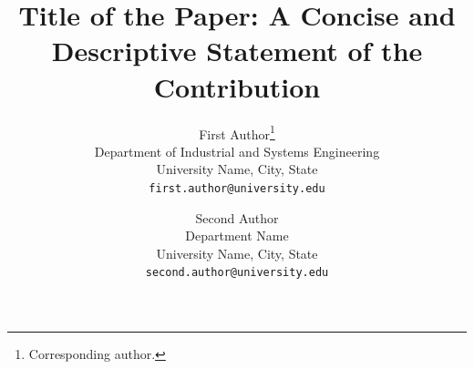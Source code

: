 \title{Title of the Paper: A Concise and Descriptive Statement of the Contribution}

\author{%
  First Author\thanks{Corresponding author.}\\
  \small Department of Industrial and Systems Engineering\\
  \small University Name, City, State\\
  \small\texttt{first.author@university.edu}
  \and
  Second Author\\
  \small Department Name\\
  \small University Name, City, State\\
  \small\texttt{second.author@university.edu}
}

\date{}   %
